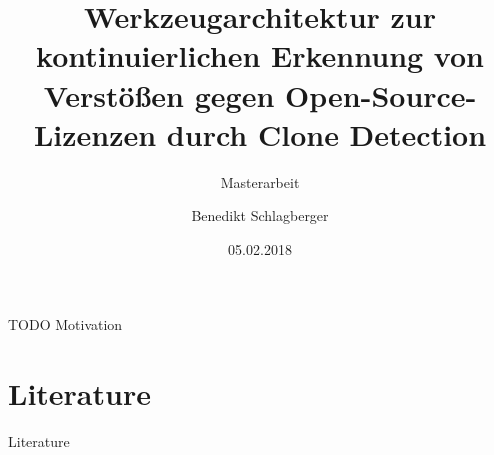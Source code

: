 \documentclass[handout,utf8,14pt]{beamer} %
\title{Werkzeugarchitektur zur kontinuierlichen	Erkennung von Verstößen gegen Open-Source-Lizenzen durch Clone Detection}
\subtitle{{\small Masterarbeit}}
\author{Benedikt Schlagberger}
\institute[TUM]{{\small Technische Universität München}}
\date{05.02.2018}
\begin{document}
{
		\begin{frame}
			\titlepage
		\end{frame}
}

\begin{frame}
TODO Motivation
\end{frame}








\section*{Literature}
\begin{frame}[t,allowframebreaks]{Literature}
\begin{tiny}
	\printbibliography{}
\end{tiny}
\end{frame}
\end{document}
